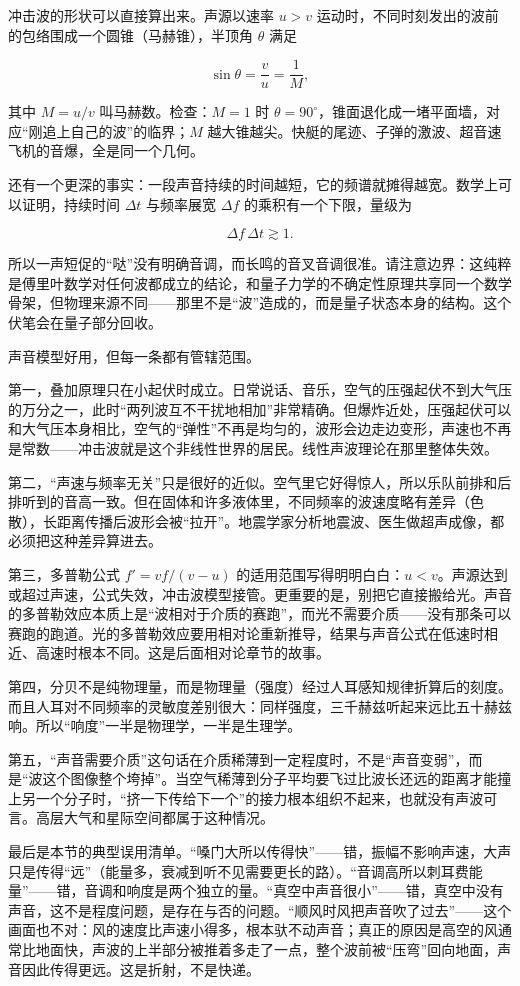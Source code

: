\begin{challenge}
冲击波的形状可以直接算出来。声源以速率 \(u>v\) 运动时，不同时刻发出的波前的包络围成一个圆锥（马赫锥），半顶角 \(\theta\) 满足

\[
  \sin\theta = \frac{v}{u} = \frac{1}{M},
\]

其中 \(M=u/v\) 叫马赫数。检查：\(M=1\) 时 \(\theta=90^\circ\)，锥面退化成一堵平面墙，对应“刚追上自己的波”的临界；\(M\) 越大锥越尖。快艇的尾迹、子弹的激波、超音速飞机的音爆，全是同一个几何。

还有一个更深的事实：一段声音持续的时间越短，它的频谱就摊得越宽。数学上可以证明，持续时间 \(\Delta t\) 与频率展宽 \(\Delta f\) 的乘积有一个下限，量级为

\[
  \Delta f\,\Delta t \gtrsim 1 .
\]

所以一声短促的“哒”没有明确音调，而长鸣的音叉音调很准。请注意边界：这纯粹是傅里叶数学对任何波都成立的结论，和量子力学的不确定性原理共享同一个数学骨架，但物理来源不同——那里不是“波”造成的，而是量子状态本身的结构。这个伏笔会在量子部分回收。
\end{challenge}


\begin{mainline}
声音模型好用，但每一条都有管辖范围。

第一，叠加原理只在小起伏时成立。日常说话、音乐，空气的压强起伏不到大气压的万分之一，此时“两列波互不干扰地相加”非常精确。但爆炸近处，压强起伏可以和大气压本身相比，空气的“弹性”不再是均匀的，波形会边走边变形，声速也不再是常数——冲击波就是这个非线性世界的居民。线性声波理论在那里整体失效。

第二，“声速与频率无关”只是很好的近似。空气里它好得惊人，所以乐队前排和后排听到的音高一致。但在固体和许多液体里，不同频率的波速度略有差异（色散），长距离传播后波形会被“拉开”。地震学家分析地震波、医生做超声成像，都必须把这种差异算进去。

第三，多普勒公式 \(f'=vf/(v-u)\) 的适用范围写得明明白白：\(u<v\)。声源达到或超过声速，公式失效，冲击波模型接管。更重要的是，别把它直接搬给光。声音的多普勒效应本质上是“波相对于介质的赛跑”，而光不需要介质——没有那条可以赛跑的跑道。光的多普勒效应要用相对论重新推导，结果与声音公式在低速时相近、高速时根本不同。这是后面相对论章节的故事。

第四，分贝不是纯物理量，而是物理量（强度）经过人耳感知规律折算后的刻度。而且人耳对不同频率的灵敏度差别很大：同样强度，三千赫兹听起来远比五十赫兹响。所以“响度”一半是物理学，一半是生理学。

第五，“声音需要介质”这句话在介质稀薄到一定程度时，不是“声音变弱”，而是“波这个图像整个垮掉”。当空气稀薄到分子平均要飞过比波长还远的距离才能撞上另一个分子时，“挤一下传给下一个”的接力根本组织不起来，也就没有声波可言。高层大气和星际空间都属于这种情况。

最后是本节的典型误用清单。“嗓门大所以传得快”——错，振幅不影响声速，大声只是传得“远”（能量多，衰减到听不见需要更长的路）。“音调高所以刺耳费能量”——错，音调和响度是两个独立的量。“真空中声音很小”——错，真空中没有声音，这不是程度问题，是存在与否的问题。“顺风时风把声音吹了过去”——这个画面也不对：风的速度比声速小得多，根本驮不动声音；真正的原因是高空的风通常比地面快，声波的上半部分被推着多走了一点，整个波前被“压弯”回向地面，声音因此传得更远。这是折射，不是快递。
\end{mainline}

